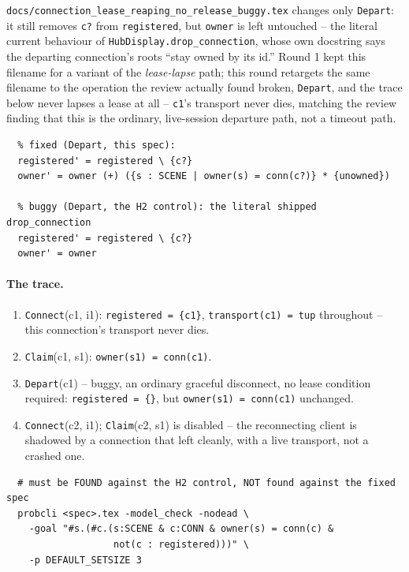 \documentclass[a4paper,10pt,fleqn]{article}
\begin{document}
\texttt{docs/connection\_lease\_reaping\_no\_release\_buggy.tex} changes
only \texttt{Depart}: it still removes \texttt{c?} from
\texttt{registered}, but \texttt{owner} is left untouched -- the literal
current behaviour of \texttt{HubDisplay.drop\_connection}, whose own
docstring says the departing connection's roots ``stay owned by its id.''
Round 1 kept this filename for a variant of the \emph{lease-lapse} path;
this round retargets the same filename to the operation the review
actually found broken, \texttt{Depart}, and the trace below never lapses
a lease at all -- \texttt{c1}'s transport never dies, matching the review
finding that this is the ordinary, live-session departure path, not a
timeout path.

\begin{verbatim}
  % fixed (Depart, this spec):
  registered' = registered \ {c?}
  owner' = owner (+) ({s : SCENE | owner(s) = conn(c?)} * {unowned})

  % buggy (Depart, the H2 control): the literal shipped drop_connection
  registered' = registered \ {c?}
  owner' = owner
\end{verbatim}

\paragraph{The trace.}
\begin{enumerate}
  \item \texttt{Connect}(c1, i1): \texttt{registered = \{c1\}},
    \texttt{transport(c1) = tup} throughout -- this connection's
    transport never dies.
  \item \texttt{Claim}(c1, s1): \texttt{owner(s1) = conn(c1)}.
  \item \texttt{Depart}(c1) -- buggy, an ordinary graceful disconnect,
    no lease condition required: \texttt{registered = \{\}}, but
    \texttt{owner(s1) = conn(c1)} unchanged.
  \item \texttt{Connect}(c2, i1); \texttt{Claim}(c2, s1) is disabled --
    the reconnecting client is shadowed by a connection that left
    cleanly, with a live transport, not a crashed one.
\end{enumerate}

\begin{verbatim}
  # must be FOUND against the H2 control, NOT found against the fixed spec
  probcli <spec>.tex -model_check -nodead \
    -goal "#s.(#c.(s:SCENE & c:CONN & owner(s) = conn(c) &
                   not(c : registered)))" \
    -p DEFAULT_SETSIZE 3
\end{verbatim}
\end{document}
